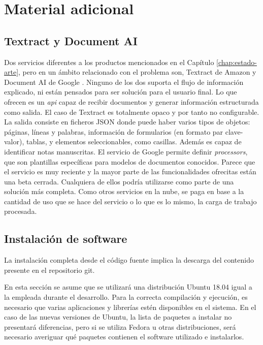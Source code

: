 
\chapter{Material adicional}
\label{chap:material-adicional}

\section{Textract y Document AI}
\label{sec:textract-y-document-ai}

Dos servicios diferentes a los productos mencionados en el Capítulo \ref{chap:estado-arte}, pero en un ámbito relacionado con el problema son, Textract de Amazon \cite{solucionesComerciales_amazon_textract} y Document AI de Google \cite{solucionesComerciales_google_documentAI}. Ninguno de los dos suporta el flujo de información explicado, ni están pensados para ser solución para el usuario final. Lo que ofrecen es un \emph{\acrshort{api}} capaz de recibir documentos y generar información estructurada como salida. El caso de Textract es totalmente opaco y por tanto no configurable. La salida consiste en ficheros JSON donde puede haber varios tipos de objetos: páginas, líneas y palabras, información de formularios (en formato par clave-valor), tablas, y elementos seleccionables, como casillas. Además es capaz de identificar notas manuscritas. El servicio de Google permite definir \emph{processors}, que son plantillas específicas para modelos de documentos conocidos. Parece que el servicio es muy reciente y la mayor parte de las funcionalidades ofrecitas están una beta cerrada. Cualquiera de ellos podría utilizarse como parte de una solución más completa. Como otros servicios en la nube, se paga en base a la cantidad de uso que se hace del servicio o lo que es lo mismo, la carga de trabajo procesada.

\section{Instalación de software}
\label{chap:instalacion-software}

La instalación completa desde el código fuente implica la descarga del contenido presente en el repositorio git.

En esta sección se asume que se utilizará una distribución Ubuntu 18.04 igual a la empleada durante el desarrollo. Para la correcta compilación y ejecución, es necesario que varias aplicaciones y librerías estén disponibles en el sistema. En el caso de las nuevas versiones de Ubuntu, la lista de paquetes a instalar no presentará diferencias, pero si se utiliza Fedora u otras distribuciones, será necesario averiguar qué paquetes contienen el software utilizado e instalarlos.

